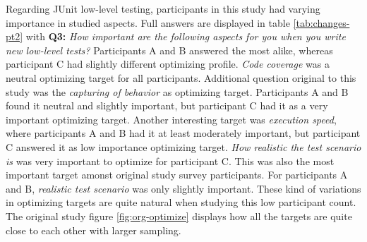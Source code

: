 Regarding JUnit low-level testing, participants in this study had varying importance in studied aspects. Full answers are
displayed in table \ref{tab:changes-pt2} with \textbf{Q3:} \textit{How important are the following aspects for you when you write new low-level tests?}
Participants A and B answered
the most alike, whereas participant C had slightly different optimizing profile. \textit{Code coverage}
was a neutral optimizing target for all participants. Additional question original to this study was the \textit{capturing of behavior}
as optimizing target. Participants A and B found it neutral and slightly important,
but participant C had it as a very important optimizing target. Another interesting target was \textit{execution speed},
where participants A and B had it at least moderately important, but participant C
answered it as low importance optimizing target. \textit{How realistic the test scenario is} was very important to optimize for
participant C. This was also the most important target amonst original study survey participants.
For participants A and B, \textit{realistic test scenario} was only slightly important.
These kind of variations in optimizing targets are quite natural when studying this low participant count. The original study
figure \ref{fig:org-optimize} displays how all the targets are quite close to each other with larger sampling.

